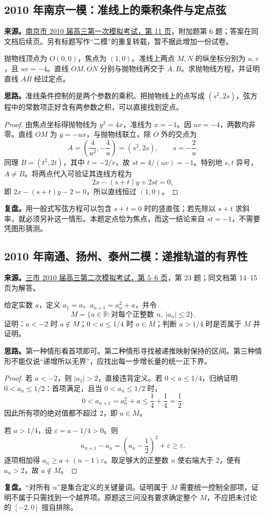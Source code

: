 \documentclass[UTF8,12pt,a4paper,fontset=fandol]{ctexart}
\begin{document}
\subsection{2010 年南京一模：准线上的乘积条件与定点弦}\label{sec:c2010nj1}
\textbf{来源。}\href{https://doc.xuehai.net/b9a0d69dda6b154ccecee1997-11.html}{南京市 2010 届高三第一次模拟考试，第 11 页}，附加题第 6 题；答案在同文档后续页。另有标题写作“二模”的重复转载，暂不据此增加一份试卷。
\begin{example}[题意]
抛物线顶点为 $O(0,0)$，焦点为 $(1,0)$。准线上两点 $M,N$ 的纵坐标分别为 $u,v$，且 $uv=-4$。直线 $OM,ON$ 分别与抛物线再交于 $A,B$。求抛物线方程，并证明直线 $AB$ 经过定点。
\end{example}
\textbf{思路。}准线条件控制的是两个参数的乘积。把抛物线上的点写成 $(s^2,2s)$，弦方程中的常数项正好含有两参数之积，可以直接找到定点。
\begin{proof}
由焦点坐标得抛物线为 $y^2=4x$，准线为 $x=-1$。因 $uv=-4$，两数均非零。直线 $OM$ 为 $y=-ux$，与抛物线联立，除 $O$ 外的交点为
\[
A=\left(\frac4{u^2},-\frac4u\right)=(s^2,2s),\qquad s=-\frac2u.
\]
同理 $B=(t^2,2t)$，其中 $t=-2/v$，故 $st=4/(uv)=-1$。特别地 $s,t$ 异号，$A\ne B$。将两点代入可验证其连线方程为
\[
2x-(s+t)y+2st=0,
\]
即 $2x-(s+t)y-2=0$，所以直线恒过 $(1,0)$。
\end{proof}
\textbf{复盘。}用一般式写弦方程可以包含 $s+t=0$ 时的竖直弦；若先除以 $s+t$ 求斜率，就必须另补这一情形。本题定点恰为焦点，而这一结论来自 $st=-1$，不需要凭图形猜测。

\subsection{2010 年南通、扬州、泰州二模：递推轨道的有界性}\label{sec:c2010nty2}
\textbf{来源。}\href{https://doc.xuehai.net/b0564b8cf950bcb418f9af425-5.html}{三市 2010 届高三第二次模拟考试，第 5--6 页}，第 23 题；同文档第 14--15 页为解答。
\begin{example}[题意]
给定实数 $a$，定义 $a_1=a$、$a_{n+1}=a_n^2+a$，并令
\[
M=\{a\in\mathbb R:\text{对每个正整数 }n,\ |a_n|\leq2\}.
\]
证明：$a<-2$ 时 $a\notin M$；$0<a\leq1/4$ 时 $a\in M$；判断 $a>1/4$ 时是否属于 $M$ 并证明。
\end{example}
\textbf{思路。}第一种情形看首项即可。第二种情形寻找被递推映射保持的区间。第三种情形不能仅说“递增所以无界”，应找出每一步增长量的统一正下界。
\begin{proof}
若 $a<-2$，则 $|a_1|>2$，直接违背定义。若 $0<a\leq1/4$，归纳证明 $0<a_n\leq1/2$：首项满足，且当 $0<a_n\leq1/2$ 时，
\[
0<a_{n+1}=a_n^2+a\leq\frac14+\frac14=\frac12.
\]
因此所有项的绝对值都不超过 $2$，即 $a\in M$。

若 $a>1/4$，设 $\varepsilon=a-1/4>0$。则
\[
a_{n+1}-a_n=\left(a_n-\frac12\right)^2+\varepsilon\geq\varepsilon.
\]
逐项相加得 $a_n\geq a+(n-1)\varepsilon$。取足够大的正整数 $n$ 使右端大于 $2$，便有 $a_n>2$，故 $a\notin M$。
\end{proof}
\textbf{复盘。}“对所有 $n$”是集合定义的关键量词。证明属于 $M$ 需要统一控制全部项，证明不属于只需找到一个越界项。原题这三问没有要求确定整个 $M$，不应把未讨论的 $[-2,0]$ 擅自排除。
\end{document}
